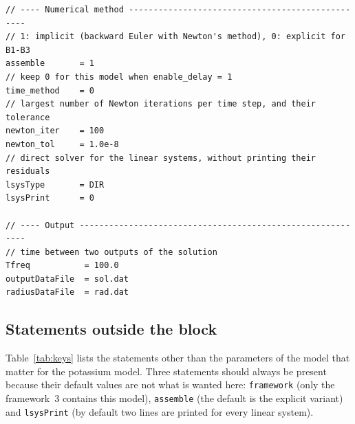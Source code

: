 \documentclass[11pt]{article}
\newcommand{\code}[1]{\texttt{#1}}
\begin{document}
\begin{lstlisting}[basicstyle=\footnotesize\ttfamily]
// ---- Numerical method -------------------------------------------------
// 1: implicit (backward Euler with Newton's method), 0: explicit for B1-B3
assemble       = 1
// keep 0 for this model when enable_delay = 1
time_method    = 0
// largest number of Newton iterations per time step, and their tolerance
newton_iter    = 100
newton_tol     = 1.0e-8
// direct solver for the linear systems, without printing their residuals
lsysType       = DIR
lsysPrint      = 0

// ---- Output -----------------------------------------------------------
// time between two outputs of the solution
Tfreq           = 100.0
outputDataFile  = sol.dat
radiusDataFile  = rad.dat
\end{lstlisting}

\subsection{Statements outside the block}
Table~\ref{tab:keys} lists the statements other than the parameters of the model that matter for the potassium model.
Three statements should always be present because their default values are not what is wanted here: \code{framework} (only the framework~3 contains this model), \code{assemble} (the default is the explicit variant) and \code{lsysPrint} (by default two lines are printed for every linear system).
\end{document}
